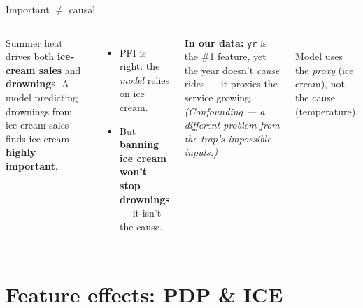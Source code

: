 \documentclass[aspectratio=169]{beamer}
\begin{document}
\begin{frame}{Important $\neq$ causal}
  \begin{columns}[T]
    Summer heat drives both \textbf{ice-cream sales} and \textbf{drownings}. A model predicting
    drownings from ice-cream sales finds ice cream \textbf{highly important}.
    \vskip 6pt
    \begin{itemize}\small
      \item PFI is right: the \emph{model} relies on ice cream.
      \item But \textbf{banning ice cream won't stop drownings} --- it isn't the cause.
    \end{itemize}
    \vskip 4pt
    \vskip 4pt
    {\footnotesize \textbf{In our data:} \texttt{yr} is the \#1 feature, yet the year doesn't
    \emph{cause} rides --- it proxies the service growing. \emph{(Confounding --- a different problem
    from the trap's impossible inputs.)}}
    \begin{center}
      \\[2pt]
      \scriptsize Model uses the \emph{proxy} (ice cream), not the cause (temperature).
    \end{center}
  \end{columns}
\end{frame}

\section{Feature effects: PDP \& ICE}
\end{document}
